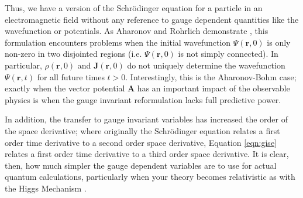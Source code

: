 Thus, we have a version of the Schr\"odinger equation for a particle in an
electromagnetic field without any reference to gauge dependent quantities like
the wavefunction or potentials. As Aharonov and Rohrlich demonstrate
\cite{aharonov-rohrlich}, this formulation encounters problems when the initial
wavefunction $\Psi(\mathbf{r}, 0)$ is only non-zero in two disjointed regions
(i.e. $\Psi(\mathbf{r}, 0)$ is not simply connected). In particular,
$\rho(\mathbf{r}, 0)$ and $\mathbf{J}(\mathbf{r}, 0)$ do not uniquely determine
the wavefunction $\Psi(\mathbf{r}, t)$ for all future times $t > 0$.
Interestingly, this is the Aharonov-Bohm case; exactly when the vector potential
$\mathbf{A}$ has an important impact of the observable physics is when the gauge
invariant reformulation lacks full predictive power.

In addition, the transfer to gauge invariant variables has increased the order
of the space derivative; where originally the Schr\"odinger equation relates a
first order time derivative to a second order space derivative, Equation
\ref{eqn:gise} relates a first order time derivative to a third order space
derivative. It is clear, then, how much simpler the gauge dependent variables
are to use for actual quantum calculations, particularly when your theory
becomes relativistic as with the Higgs Mechanism
\cite{higgs-1964,englert-brout,guralnik-hagen-kibble}.
